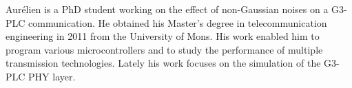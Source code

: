 Aurélien is a PhD student working on the effect of
non-Gaussian noises on a G3-PLC communication. He obtained
his Master’s degree in telecommunication engineering in 2011
from the University of Mons. His work enabled him to program
various microcontrollers and to study the performance of
multiple transmission technologies. Lately his work focuses on
the simulation of the G3-PLC PHY layer.
